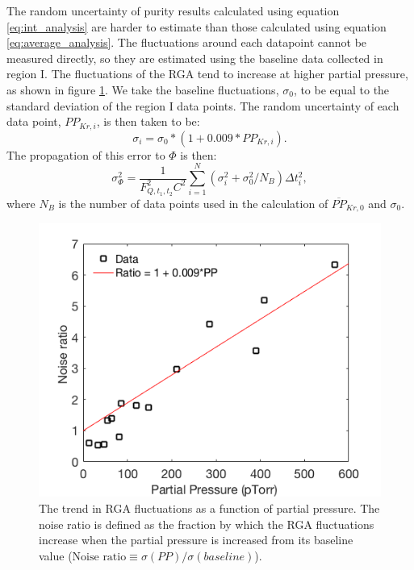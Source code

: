 The random uncertainty of purity results calculated using equation \ref{eq:int_analysis} are harder to estimate than those calculated using equation \ref{eq:average_analysis}. The fluctuations around each datapoint cannot be measured directly, so they are estimated using the baseline data collected in region I. The fluctuations of the RGA tend to increase at higher partial pressure, as shown in figure \ref{fig:RGAnoise}. We take the baseline fluctuations, $\sigma_0$, to be equal to the standard deviation of the region I data points. The random uncertainty of each data point, $PP_{Kr,i}$, is then taken to be:
\begin{equation}
\label{eq:preserr}
\sigma_i=\sigma_{0}*(1+0.009*PP_{Kr,i}).
\end{equation}
The propagation of this error to $\Phi$ is then:
\begin{equation}
\sigma_{\Phi}^2=\frac{1}{F_{Q,t_1,t_2}^2C^2}\sum_{i=1}^{N}(\sigma_i^2+\sigma_0^2/N_B)\Delta t_i^2,
\end{equation}
where $N_B$ is the number of data points used in the calculation of $\overline{PP}_{Kr,0}$ and $\sigma_0$.
\begin{figure}[h!]
  \includegraphics[width=\linewidth]{Figures/RGA_Noise_v_PP.png}
  \caption{The trend in RGA fluctuations as a function of partial pressure. The noise ratio is defined as the fraction by which the RGA fluctuations increase when the partial pressure is increased from its baseline value ($\textrm{Noise ratio} \equiv \sigma(PP)/\sigma(baseline)$). }
  \label{fig:RGAnoise}
\end{figure}


